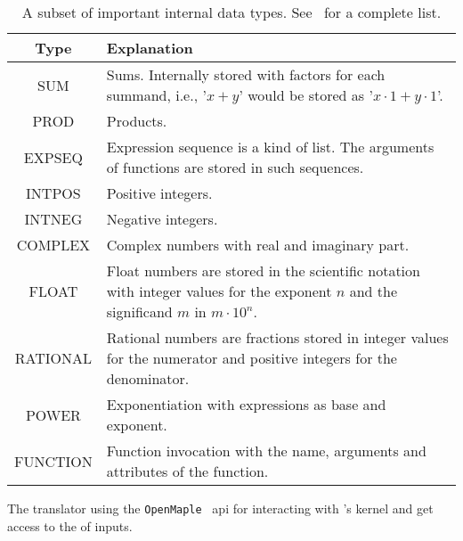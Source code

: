 \begin{table}[h]
\centering
\begin{tabular}{cp{10cm}}
	\hline
	Type & Explanation\\
	\hline
	SUM & Sums. Internally stored with factors for each summand, i.e., '$x+y$' would be stored as '$x \cdot 1 + y \cdot 1$'.\\
	PROD & Products.\\
	EXPSEQ & Expression sequence is a kind of list. The arguments of functions are stored in such sequences.\\
	INTPOS & Positive integers.\\
	INTNEG & Negative integers.\\
	COMPLEX & Complex numbers with real and imaginary part.\\
	FLOAT & Float numbers are stored in the scientific notation with integer values for the exponent $n$ and the significand $m$ in $m \cdot 10^n$.\\
	RATIONAL & Rational numbers are fractions stored in integer values for the numerator and positive integers for the denominator.\\
	POWER & Exponentiation with expressions as base and exponent.\\
	FUNCTION & Function invocation with the name, arguments and attributes of the function.\\
	\hline
\end{tabular}
\caption{A subset of important internal \Maple{} data types. See~\parencite{MAPLE:ProgrammingGuide} for a complete list.}
\label{tab:maple-types}
\end{table}

The translator using the \texttt{OpenMaple}~\parencite[\S 14.3]{MAPLE:ProgrammingGuide} \gls*{api} for interacting with \Maple's kernel and get access to the \inertF{} of inputs.



